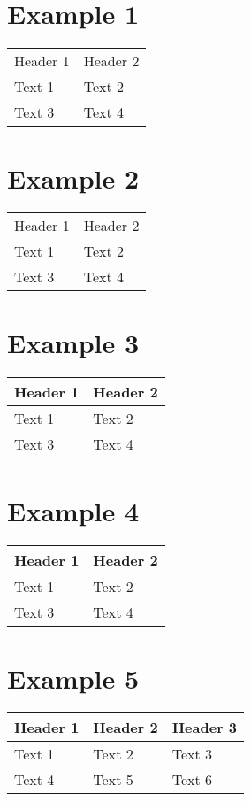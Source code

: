 \section{Example 1}\label{example-1}

\begin{longtable}[c]{@{}ll@{}}
\toprule
Header 1 & Header 2\tabularnewline
Text 1 & Text 2\tabularnewline
Text 3 & Text 4\tabularnewline
\bottomrule
\end{longtable}

\section{Example 2}\label{example-2}

\begin{longtable}[c]{@{}ll@{}}
\toprule
Header 1 & Header 2\tabularnewline
Text 1 & Text 2\tabularnewline
Text 3 & Text 4\tabularnewline
\bottomrule
\end{longtable}

\section{Example 3}\label{example-3}

\begin{longtable}[c]{@{}ll@{}}
\toprule
Header 1 & Header 2\tabularnewline
\midrule
\endhead
Text 1 & Text 2\tabularnewline
Text 3 & Text 4\tabularnewline
\bottomrule
\end{longtable}

\section{Example 4}\label{example-4}

\begin{longtable}[c]{@{}ll@{}}
\toprule
Header 1 & Header 2\tabularnewline
\midrule
\endhead
Text 1 & Text 2\tabularnewline
Text 3 & Text 4\tabularnewline
\bottomrule
\end{longtable}

\section{Example 5}\label{example-5}

\begin{longtable}[c]{@{}lll@{}}
\toprule
\textbf{Header 1} & Header 2 & Header 3\tabularnewline
\midrule
\endhead
Text 1\autocite{source} & Text 2 & Text 3\tabularnewline
Text 4 & Text 5 & Text 6\tabularnewline
\bottomrule
\end{longtable}

